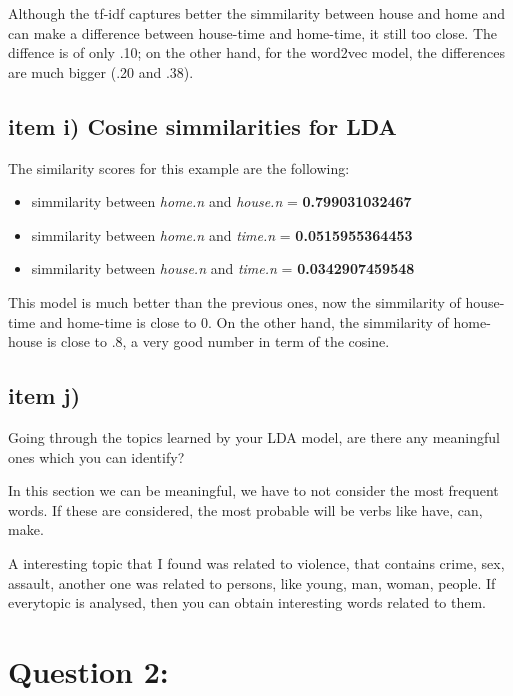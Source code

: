 \documentclass{article}
\begin{document}
Although the tf-idf captures better the simmilarity between house and home and can make a difference between house-time and home-time, it still too close. The diffence is of only .10; on the other hand, for the word2vec model, the differences are much bigger (.20 and .38).

\subsection{item i) Cosine simmilarities for LDA}
The similarity scores for this example are the following:
\begin{itemize}
\item{simmilarity between \textit{home.n} and \textit{house.n} = \textbf{0.799031032467}}
\item{simmilarity between \textit{home.n} and \textit{time.n} = \textbf{0.0515955364453}} 
\item{simmilarity between \textit{house.n} and \textit{time.n} = \textbf{0.0342907459548}} 
\end{itemize}


This model is much better than the previous ones, now the simmilarity of house-time and home-time is close to 0. On the other hand, the simmilarity of home-house is close to .8, a very good number in term of the cosine.
\subsection{item j)}
Going through the topics learned by your LDA model, are there any meaningful ones which you can identify?

In this section we can be meaningful, we have to not consider the most frequent words.
If these are considered, the most probable will be verbs like have, can, make.

A interesting topic that I found was related to violence, that contains crime, sex, assault, another one was related to persons, like young, man, woman, people. If everytopic is analysed, then you can obtain interesting words related to them.

\section{Question 2:}
\end{document}
